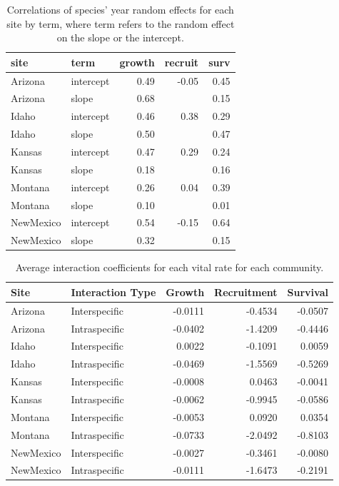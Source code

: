 \documentclass[12pt,]{article}
\begin{document}
\begin{table}[ht]
\centering
\caption{Correlations of species' year random effects for each site by term, where term refers to the random effect on the slope or the intercept.} 
\begin{tabular}{llrrr}
  \hline
site & term & growth & recruit & surv \\ 
  \hline
Arizona & intercept & 0.49 & -0.05 & 0.45 \\ 
  Arizona & slope & 0.68 &  & 0.15 \\ 
  Idaho & intercept & 0.46 & 0.38 & 0.29 \\ 
  Idaho & slope & 0.50 &  & 0.47 \\ 
  Kansas & intercept & 0.47 & 0.29 & 0.24 \\ 
  Kansas & slope & 0.18 &  & 0.16 \\ 
  Montana & intercept & 0.26 & 0.04 & 0.39 \\ 
  Montana & slope & 0.10 &  & 0.01 \\ 
  NewMexico & intercept & 0.54 & -0.15 & 0.64 \\ 
  NewMexico & slope & 0.32 &  & 0.15 \\ 
   \hline
\end{tabular}
\end{table}

\begin{table}[ht]
\centering
\caption{Average interaction coefficients for each vital rate for each community.} 
\begin{tabular}{llrrr}
  \hline
Site & Interaction Type & Growth & Recruitment & Survival \\ 
  \hline
Arizona & Interspecific & -0.0111 & -0.4534 & -0.0507 \\ 
  Arizona & Intraspecific & -0.0402 & -1.4209 & -0.4446 \\ 
  Idaho & Interspecific & 0.0022 & -0.1091 & 0.0059 \\ 
  Idaho & Intraspecific & -0.0469 & -1.5569 & -0.5269 \\ 
  Kansas & Interspecific & -0.0008 & 0.0463 & -0.0041 \\ 
  Kansas & Intraspecific & -0.0062 & -0.9945 & -0.0586 \\ 
  Montana & Interspecific & -0.0053 & 0.0920 & 0.0354 \\ 
  Montana & Intraspecific & -0.0733 & -2.0492 & -0.8103 \\ 
  NewMexico & Interspecific & -0.0027 & -0.3461 & -0.0080 \\ 
  NewMexico & Intraspecific & -0.0111 & -1.6473 & -0.2191 \\ 
   \hline
\end{tabular}
\end{table}
\end{document}
